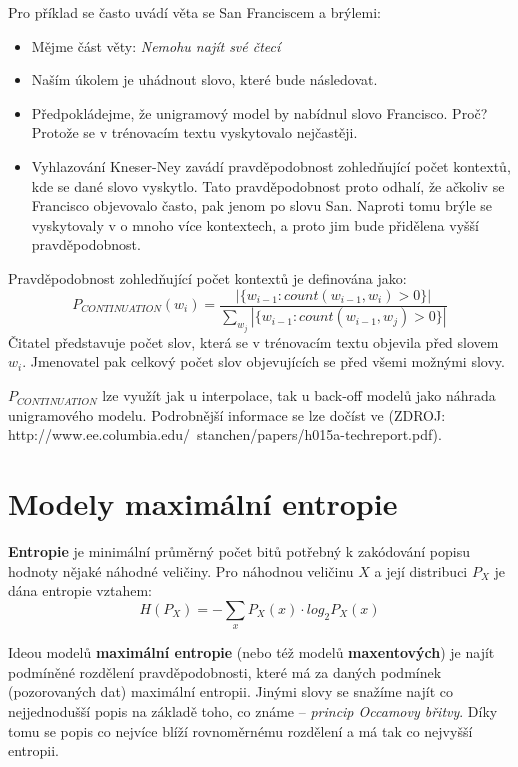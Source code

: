\documentclass[12pt,a4paper]{report}
\begin{document}
Pro příklad se často uvádí věta se San Franciscem a brýlemi:
\begin{itemize}
\item{Mějme část věty: \textit{Nemohu najít své čtecí}}
\item{Naším úkolem je uhádnout slovo, které bude následovat.}
\item{Předpokládejme, že unigramový model by nabídnul slovo Francisco. Proč? Protože se v trénovacím textu vyskytovalo nejčastěji.}
\item{Vyhlazování Kneser-Ney zavádí pravděpodobnost zohledňující počet kontextů, kde se dané slovo vyskytlo. Tato pravděpodobnost proto odhalí, že ačkoliv se Francisco objevovalo často, pak jenom po slovu San. Naproti tomu brýle se vyskytovaly v o mnoho více kontextech, a proto jim bude přidělena vyšší pravděpodobnost.}
\end{itemize}

Pravděpodobnost zohledňující počet kontextů je definována jako:
\begin{equation}
P_{CONTINUATION}(w_i) = \frac{|\{w_{i-1} : count(w_{i-1}, w_i) > 0 \}|}{\sum_{w_j} |\{w_{i-1} : count(w_{i-1}, w_j) > 0 \}|}
\end{equation}
Čitatel představuje počet slov, která se v trénovacím textu objevila před slovem $w_i$. Jmenovatel pak celkový počet slov objevujících se před všemi možnými slovy.

$P_{CONTINUATION}$ lze využít jak u interpolace, tak u back-off modelů jako náhrada unigramového modelu. Podrobnější informace se lze dočíst ve (ZDROJ: http://www.ee.columbia.edu/~stanchen/papers/h015a-techreport.pdf).

\section{Modely maximální entropie}

\textbf{Entropie} je minimální průměrný počet bitů potřebný k zakódování popisu hodnoty nějaké náhodné veličiny. Pro náhodnou veličinu $X$ a její distribuci $P_X$ je dána entropie vztahem:
\begin{equation}\label{eq:entropy}
H(P_X) = - \sum_x P_X(x) \cdot log_2 P_X(x)
\end{equation}

Ideou modelů \textbf{maximální entropie} (nebo též modelů \textbf{maxentových}) je najít podmíněné rozdělení pravděpodobnosti, které má za daných podmínek (pozorovaných dat) maximální entropii. Jinými slovy se snažíme najít co nejjednodušší popis na základě toho, co známe -- \textit{princip Occamovy břitvy}. Díky tomu se popis co nejvíce blíží rovnoměrnému rozdělení a má tak co nejvyšší entropii.
\end{document}
